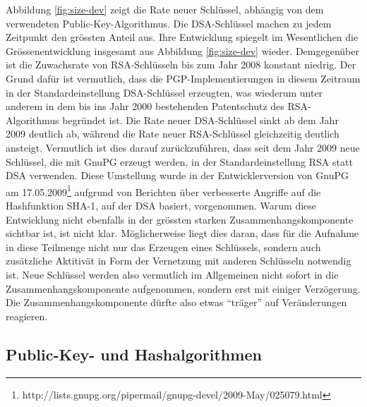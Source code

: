 Abbildung \ref{fig:size-dev} zeigt die Rate neuer Schl\"ussel,
abh\"angig von dem verwendeten Public-Key-Algorithmus. Die
DSA-Schl\"ussel machen zu jedem Zeitpunkt den gr\"ossten Anteil
aus. Ihre Entwicklung spiegelt im Wesentlichen die
Gr\"ossenentwicklung insgesamt aus Abbildung \ref{fig:size-dev}
wieder. Demgegen\"uber ist die Zuwachsrate von RSA-Schl\"usseln bis
zum Jahr 2008 konstant niedrig. Der Grund daf\"ur ist vermutlich, dass
die PGP-Implementierungen in diesem Zeitraum in der
Standardeinstellung DSA-Schl\"ussel erzeugten, was wiederum unter
anderem in dem bis ins Jahr 2000 bestehenden Patentschutz des
RSA-Algorithmus begr\"undet ist.  Die Rate neuer DSA-Schl\"ussel sinkt
ab dem Jahr 2009 deutlich ab, w\"ahrend die Rate neuer RSA-Schl\"ussel
gleichzeitig deutlich ansteigt. Vermutlich ist dies darauf
zur\"uckzuf\"uhren, dass seit dem Jahr 2009 neue Schl\"ussel, die mit
GnuPG erzeugt werden, in der Standardeinstellung RSA statt DSA
verwenden. Diese Umstellung wurde in der Entwicklerversion von GnuPG
am
17.05.2009\footnote{http://lists.gnupg.org/pipermail/gnupg-devel/2009-May/025079.html}
aufgrund von Berichten \"uber verbesserte Angriffe auf die
Hashfunktion SHA-1\cite{McDonald2009}, auf der DSA basiert,
vorgenommen. Warum diese Entwicklung nicht ebenfalls in der gr\"ossten
starken Zusammenhangskomponente sichtbar ist, ist nicht
klar. M\"oglicherweise liegt dies daran, dass f\"ur die Aufnahme in
diese Teilmenge nicht nur das Erzeugen eines Schl\"ussels, sondern
auch zus\"atzliche Aktitiv\"at in Form der Vernetzung mit anderen
Schl\"usseln notwendig ist. Neue Schl\"ussel werden also vermutlich im
Allgemeinen nicht sofort in die Zusammenhangskomponente aufgenommen,
sondern erst mit einiger Verz\"ogerung. Die Zusammenhangskomponente
d\"urfte also etwas ``tr\"ager'' auf Ver\"anderungen reagieren.

\subsection{Public-Key- und Hashalgorithmen}
\label{sec:public-key-und}

